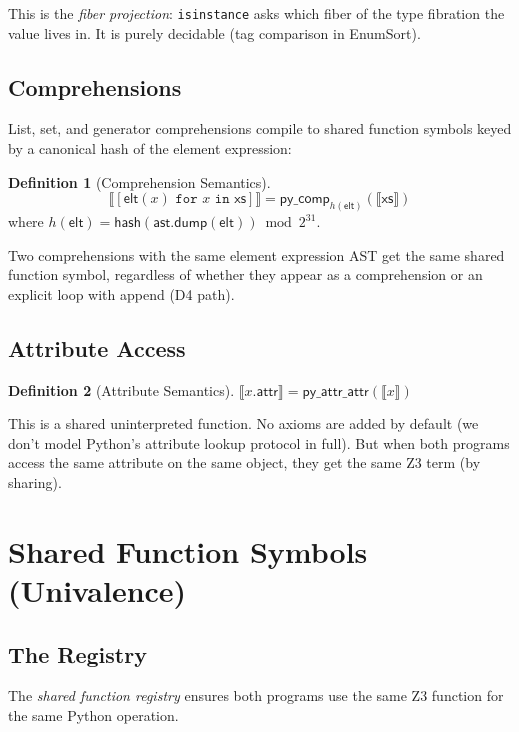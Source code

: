\documentclass[11pt,a4paper]{report}
\theoremstyle{definition}
\newtheorem{definition}{Definition}[chapter]
\theoremstyle{plain}
\newcommand{\den}[1]{\llbracket #1 \rrbracket}
\begin{document}
This is the \emph{fiber projection}: \texttt{isinstance} asks
which fiber of the type fibration the value lives in.  It is
purely decidable (tag comparison in EnumSort).

\subsection{Comprehensions}

List, set, and generator comprehensions compile to shared function
symbols keyed by a canonical hash of the element expression:

\begin{definition}[Comprehension Semantics]
\[
  \den{[\mathsf{elt}(x) \texttt{ for } x \texttt{ in } \mathsf{xs}]}
  = \mathsf{py\_comp}_{h(\mathsf{elt})}(\den{\mathsf{xs}})
\]
where $h(\mathsf{elt}) = \mathsf{hash}(\mathsf{ast.dump}(\mathsf{elt}))
\bmod 2^{31}$.
\end{definition}

Two comprehensions with the same element expression AST get the same
shared function symbol, regardless of whether they appear as a
comprehension or an explicit loop with append (D4 path).

\subsection{Attribute Access}

\begin{definition}[Attribute Semantics]
$\den{x.\mathsf{attr}} = \mathsf{py\_attr\_attr}(\den{x})$

This is a shared uninterpreted function.  No axioms are added by
default (we don't model Python's attribute lookup protocol in full).
But when both programs access the same attribute on the same object,
they get the same Z3 term (by sharing).
\end{definition}


\section{Shared Function Symbols (Univalence)}

\subsection{The Registry}

The \emph{shared function registry} ensures both programs use the
same Z3 function for the same Python operation.
\end{document}
